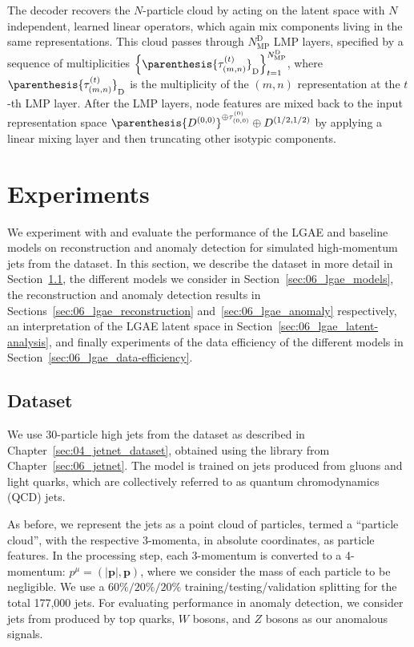The decoder recovers the $N$-particle cloud by acting on the latent space with $N$ independent, learned linear operators, which again mix components living in the same representations.
This cloud passes through $N_{\mathrm{MP}}^{\mathrm{D}}$ LMP layers, specified by a sequence of multiplicities $\left\{ \parenthesis{\tau_{(m, n)}^{(t)}}_{\mathrm{D}} \right\}_{t=1}^{N_{\mathrm{MP}}^{\mathrm{D}}}$, where $\parenthesis{\tau_{(m, n)}^{(t)}}_{\mathrm{D}}$ is the multiplicity of the $(m, n)$ representation at the $t$-th LMP layer.
After the LMP layers, node features are mixed back to the input representation space $\parenthesis{D^{(0,0)}}^{\oplus \tau_{(0,0)}^{(0)}} \oplus D^{(1/2, 1/2)}$ by applying a linear mixing layer and then truncating other isotypic components. 

\section{Experiments}
\label{sec:06_lgae_experiments}

We experiment with and evaluate the performance of the LGAE and baseline models on reconstruction and anomaly detection for simulated high-momentum jets from the \jetnet dataset.
In this section, we describe the dataset in more detail in Section~\ref{sec:06_lgae_dataset}, the different models we consider in Section~\ref{sec:06_lgae_models}, the reconstruction and anomaly detection results in Sections~\ref{sec:06_lgae_reconstruction} and~\ref{sec:06_lgae_anomaly} respectively, an interpretation of the LGAE latent space in Section~\ref{sec:06_lgae_latent-analysis}, and finally experiments of the data efficiency of the different models in Section~\ref{sec:06_lgae_data-efficiency}.

\subsection{Dataset}
\label{sec:06_lgae_dataset}

We use 30-particle high \pt jets from the \jetnet dataset as described in Chapter~\ref{sec:04_jetnet_dataset}, obtained using the \jetnet library from Chapter~\ref{sec:06_jetnet}.
The model is trained on jets produced from gluons and light quarks, which are collectively referred to as quantum chromodynamics (QCD) jets.

As before, we represent the jets as a point cloud of particles, termed a ``particle cloud'', with the respective 3-momenta, in absolute coordinates, as particle features.
In the processing step, each 3-momentum is converted to a 4-momentum: $p^\mu = (|\mathbf{p}|, \mathbf{p})$, where we consider the mass of each particle to be negligible.
We use a $60\%/20\%/20\%$ training/testing/validation splitting for the total 177,000 jets.
For evaluating performance in anomaly detection, we consider jets from \jetnet produced by top quarks, $W$ bosons, and $Z$ bosons as our anomalous signals.


